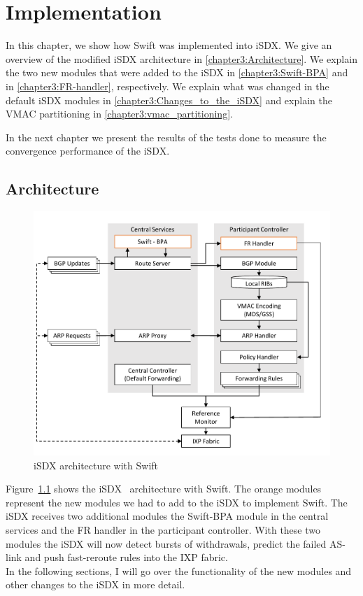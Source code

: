 \chapter{\label{chapter3}Implementation}

In this chapter, we show how Swift was implemented into iSDX. We give an overview of the modified iSDX architecture in \ref{chapter3:Architecture}. We explain the two new modules that were added to the iSDX in \ref{chapter3:Swift-BPA} and in \ref{chapter3:FR-handler}, respectively. We explain what was changed in the default iSDX modules in \ref{chapter3:Changes_to_the_iSDX} and explain the VMAC partitioning in \ref{chapter3:vmac_partitioning}.

In the next chapter we present the results of the tests done to measure the convergence 
performance of the iSDX.

\section{\label{chapter3:Architecture}Architecture}

\begin{figure}[h]
\center
\includegraphics[scale = 0.7]{Figures/design_sdx_swift_cropped.pdf}
\caption{iSDX architecture with Swift}
\label{fig:isdx_architecture_with_swift}
\end{figure}

Figure~\ref{fig:isdx_architecture_with_swift} shows the iSDX~\cite{feamster2013sdx} architecture with Swift. The orange modules represent the new modules we had to add to the iSDX to implement Swift. The iSDX receives two additional modules the Swift-BPA module in the central services and the FR handler in the participant controller. With these two modules the iSDX will now detect bursts of withdrawals, predict the failed AS-link and push fast-reroute rules into the IXP fabric. \\
In the following sections, I will go over the functionality of the new modules and other changes to the iSDX in more detail.

